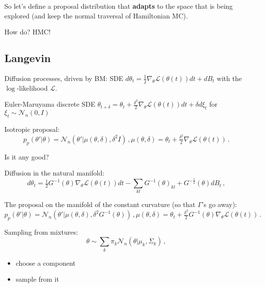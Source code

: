 So let's define a proposal distribution that \textbf{adapts}
to the space that is being explored (and keep the normal traversal
of Hamiltonian MC).

How do? HMC!

\subsection{Langevin} %
\label{sub:langevin}

Diffusion processes, driven by BM: SDE
$
d\theta_t
    = \tfrac12 \nabla_\theta \mathcal{L}(\theta(t)) dt
    + dB_t
$
with the $\log$-likelihood $\mathcal{L}$.

Euler-Maruyama discrete SDE
$
\theta_{t + \delta}
    = \theta_t
    + \tfrac{\delta^2}2 \nabla_\theta \mathcal{L}(\theta(t)) dt
    + \delta d \xi_t
$
for $\xi_t \sim \mathcal{N}_n(0, I)$

Isotropic proposal:
$$
p_p(\theta'\vert \theta)
    = \mathcal{N}_n(
        \theta'
        \vert
        \mu(\theta, \delta), \delta^2 I
        )
    \,, \mu(\theta, \delta)
    = \theta_t + \tfrac{\delta^2}2 \nabla_\theta \mathcal{L}(\theta(t))
    \,. $$

Is it any good?

Diffusion in the natural manifold:
$$
d\theta_t
    = \tfrac12 G^{-1}(\theta) \nabla_\theta \mathcal{L}(\theta(t)) dt
    - \sum_{kl} G^{-1}(\theta)_{kl}
    + G^{-\tfrac12}(\theta) dB_t
    \,, $$

The proposal on the manifold of the constant curvature (so that
$\Gamma$'s go away):
$$
p_p(\theta'\vert \theta)
    = \mathcal{N}_n(
        \theta'
        \vert
        \mu(\theta, \delta),
        \delta^2 G^{-1}(\theta)
        )
    \,, \mu(\theta, \delta)
    = \theta_t + \tfrac{\delta^2}2 G^{-1}(\theta)
        \nabla_\theta \mathcal{L}(\theta(t))
    \,. $$


Sampling from mixtures:
$$
\theta
    \sim \sum_k \pi_k \mathcal{N}_n(\theta\vert \mu_k, \Sigma_k)
    \,, $$
\begin{itemize}
    \item choose a component
    \item sample from it
\end{itemize}



